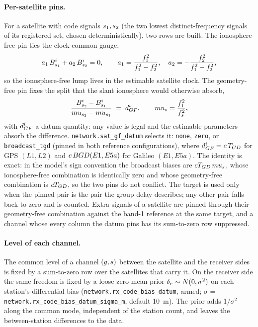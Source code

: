 \documentclass[main.tex]{subfiles}
\begin{document}
\paragraph{Per-satellite pins.}
For a satellite with code signals $s_1,s_2$ (the two lowest
distinct-frequency signals of its registered set, chosen
deterministically), two rows are built. The ionosphere-free pin ties the
clock-common gauge,
\begin{equation}
a_1\,B^i_{s_1} + a_2\,B^i_{s_2} = 0,
\qquad
a_1 = \frac{f_1^2}{f_1^2 - f_2^2},\quad
a_2 = -\frac{f_2^2}{f_1^2 - f_2^2},
\label{eq:net-cb-if}
\end{equation}
so the ionosphere-free lump lives in the estimable satellite clock. The
geometry-free pin fixes the split that the slant ionosphere would
otherwise absorb,
\begin{equation}
\frac{B^i_{s_2} - B^i_{s_1}}
     {mu_{s_2} - mu_{s_1}}
\;=\; d^i_{GF},
\qquad
mu_s = \frac{f_1^2}{f_s^2},
\label{eq:net-cb-gf}
\end{equation}
with $d^i_{GF}$ a datum quantity: any value is legal and the
estimable parameters absorb the difference. \texttt{network.sat\_gf\_datum}
selects it: \texttt{none}, \texttt{zero}, or \texttt{broadcast\_tgd}
(pinned in both reference configurations), where
$d^i_{GF} = c\,T_{GD}$ for GPS $(L1,L2)$ and
$c\,BGD(E1,E5a)$ for Galileo $(E1,E5a)$. The identity is
exact: in the model's sign convention the broadcast biases are
$c T_{GD}\,mu_s$, whose ionosphere-free combination
is identically zero and whose geometry-free combination is
$c T_{GD}$, so the two pins do not conflict. The target is
used only when the pinned pair is the pair the group delay describes;
any other pair falls back to zero and is counted. Extra signals of a
satellite are pinned through their geometry-free combination against the
band-1 reference at the same target, and a channel whose every column
the datum pins has its sum-to-zero row suppressed.

\paragraph{Level of each channel.}
The common level of a channel $(g,s)$ between the satellite and the
receiver sides is fixed by a sum-to-zero row over the satellites that
carry it. On the receiver side the same freedom is fixed by a loose
zero-mean prior $\delta_{r}\sim N(0,\sigma^2)$ on each station's
differential bias (\texttt{network.rx\_code\_bias\_datum}, armed;
$\sigma$ = \texttt{network.rx\_code\_bias\_datum\_sigma\_m}, default
\SI{10}{\metre}). The prior adds $1/\sigma^2$ along the common mode,
independent of the station count, and leaves the between-station
differences to the data.
\end{document}
